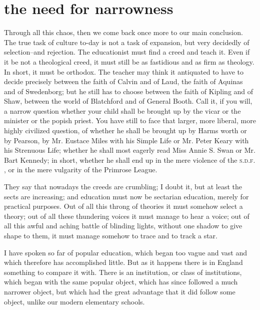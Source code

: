 \documentclass[final,10pt,letterpaper,twocolumn,openany]{book}
\begin{document}
\section{the need for narrowness}
    Through all this chaos, then we come back once more to our main
conclusion. The true task of culture to-day is not a task of expansion, but
very decidedly of selection--and rejection. The educationist must find a
creed and teach it. Even if it be not a theological creed, it must still be as
fastidious and as firm as theology. In short, it must be orthodox. The
teacher may think it antiquated to have to decide precisely between the
faith of Calvin and of Laud, the faith of Aquinas and of Swedenborg; but
he still has to choose between the faith of Kipling and of Shaw, between
the world of Blatchford and of General Booth. Call it, if you will, a narrow
question whether your child shall be brought up by the vicar or the
minister or the popish priest. You have still to face that larger, more liberal,
more highly civilized question, of whether he shall be brought up by
Harms worth or by Pearson, by Mr. Eustace Miles with his Simple Life or
Mr. Peter Keary with his Strenuous Life; whether he shall most eagerly
read Miss Annie S. Swan or Mr. Bart Kennedy; in short, whether he shall
end up in the mere violence of the \textsc{s.d.f.} , or in the mere vulgarity of the
Primrose League. 

They say that nowadays the creeds are crumbling; I
doubt it, but at least the sects are increasing; and education must now be
sectarian education, merely for practical purposes. Out of all this throng of
theories it must somehow select a theory; out of all these thundering
voices it must manage to hear a voice; out of all this awful and aching
battle of blinding lights, without one shadow to give shape to them, it must
manage somehow to trace and to track a star.

I have spoken so far of popular education, which began too vague and
vast and which therefore has accomplished little. But as it happens there is
in England something to compare it with. There is an institution, or class
of institutions, which began with the same popular object, which has since
followed a much narrower object, but which had the great advantage that
it did follow some object, unlike our modern elementary schools.
\end{document}
